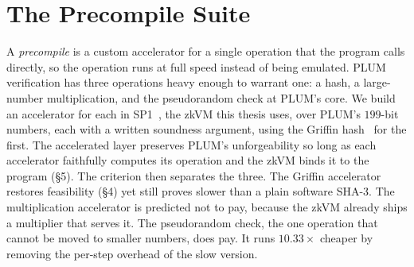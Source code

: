 \section{The Precompile Suite}
A \emph{precompile} is a custom accelerator for a single operation that the program calls directly, so the operation runs at full speed instead of being emulated. PLUM verification has three operations heavy enough to warrant one: a hash, a large-number multiplication, and the pseudorandom check at PLUM's core. We build an accelerator for each in SP1~\cite{succinct2024sp1}, the zkVM this thesis uses, over PLUM's $199$-bit numbers, each with a written soundness argument, using the Griffin hash~\cite{cryptoeprint:2022/403} for the first. The accelerated layer preserves PLUM's unforgeability so long as each accelerator faithfully computes its operation and the zkVM binds it to the program (\S5). The criterion then separates the three. The Griffin accelerator restores feasibility (\S4) yet still proves slower than a plain software SHA-3. The multiplication accelerator is predicted not to pay, because the zkVM already ships a multiplier that serves it. The pseudorandom check, the one operation that cannot be moved to smaller numbers, does pay. It runs $10.33\times$ cheaper by removing the per-step overhead of the slow version.
